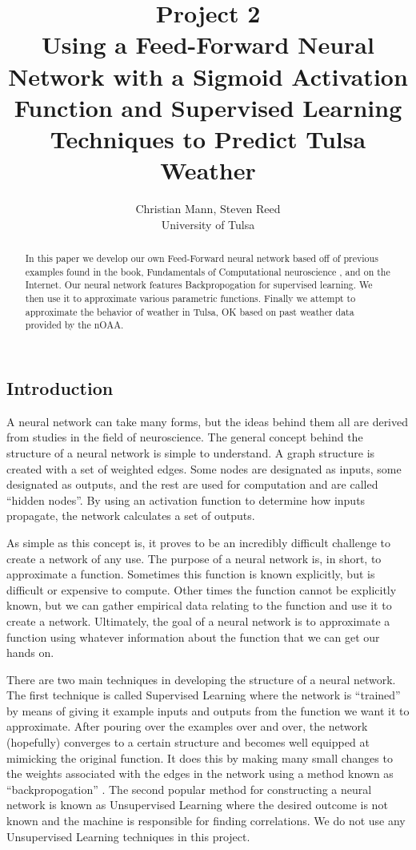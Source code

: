 \documentclass{article}
\title{Project 2\\Using a Feed-Forward Neural Network with a Sigmoid Activation Function and Supervised Learning Techniques to Predict Tulsa Weather}
\author{Christian Mann, Steven Reed \\
		University of Tulsa}
\begin{document}
\maketitle

\begin{multicols}{2}

\begin{abstract}
In this paper we develop our own Feed-Forward neural network based off of previous examples found in the book, Fundamentals of Computational neuroscience \cite{trappenberg}, and on the Internet. Our neural network features Backpropogation for supervised learning. We then use it to approximate various parametric functions. Finally we attempt to approximate the behavior of weather in Tulsa, OK based on past weather data provided by the nOAA.
\end{abstract}

\section{Introduction}

A neural network can take many forms, but the ideas behind them all are derived from studies in the field of neuroscience. The general concept behind the structure of a neural network is simple to understand. A graph structure is created with a set of weighted edges. Some nodes are designated as inputs, some designated as outputs, and the rest are used for computation and are called ``hidden nodes''. By using an activation function to determine how inputs propagate, the network calculates a set of outputs.

As simple as this concept is, it proves to be an incredibly difficult challenge to create a network of any use. The purpose of a neural network is, in short, to approximate a function. Sometimes this function is known explicitly, but is difficult or expensive to compute. Other times the function cannot be explicitly known, but we can gather empirical data relating to the function and use it to create a network. Ultimately, the goal of a neural network is to approximate a function using whatever information about the function that we can get our hands on.

There are two main techniques in developing the structure of a neural network. The first technique is called Supervised Learning where the network is ``trained'' by means of giving it example inputs and outputs from the function we want it to approximate. After pouring over the examples over and over, the network (hopefully) converges to a certain structure and becomes well equipped at mimicking the original function. It does this by making many small changes to the weights associated with the edges in the network using a method known as ``backpropogation'' \cite{trappenberg}. The second popular method for constructing a neural network is known as Unsupervised Learning where the desired outcome is not known and the machine is responsible for finding correlations. We do not use any Unsupervised Learning techniques in this project.


\end{multicols}
\end{document}
